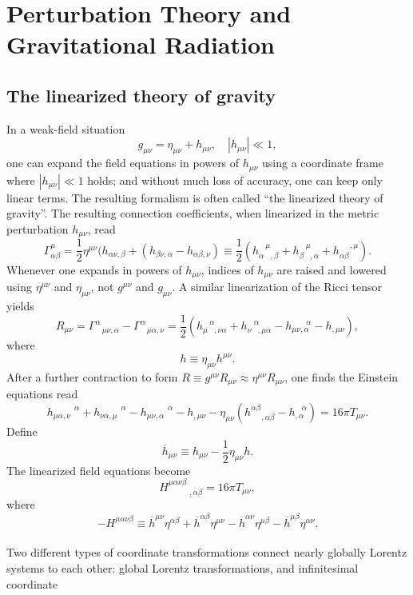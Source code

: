 \chapter{Perturbation Theory and Gravitational Radiation}
\section{The linearized theory of gravity}
In a weak-field situation
\[g_{\mu\nu} = \eta_{\mu\nu} + h_{\mu\nu} , \quad |h_{\mu\nu}| \ll 1 ,\]
one can expand the field equations in powers of $h_{\mu\nu}$ using a coordinate frame where $|h_{\mu\nu}| \ll 1$ holds; and without much loss of accuracy, one can keep only linear terms. The resulting formalism is often called ``the linearized theory of gravity''. The resulting connection coefficients, when linearized in the metric perturbation $h_{\mu\nu}$, read 
\[\Gamma^{\mu}_{\alpha \beta} = \frac{1}{2}\eta^{\mu\nu} (h_{\alpha\nu,\beta} + (h_{\beta\nu,\alpha} - h_{\alpha\beta,\nu}) \equiv \frac{1}{2}(h_{\alpha \phantom{*},\beta}^{\phantom{*} \mu} + h_{\beta \phantom{*},\alpha}^{\phantom{*} \mu} + h_{\alpha\beta}^{\phantom{**} ,\mu} ).\]
Whenever one expands in powers of $h_{\mu\nu}$, indices of $h_{\mu\nu}$ are raised and lowered using $\eta^{\mu\nu}$ and $\eta_{\mu\nu}$, not $g^{\mu\nu}$ and $g_{\mu\nu}$. A similar linearization of the Ricci tensor yields
\[R_{\mu\nu} = \Gamma^{\alpha}_{\phantom{*}\mu\nu,\alpha} - \Gamma^{\alpha}_{\phantom{*}\mu\alpha,\nu} = \frac{1}{2}(h_{\mu \phantom{*},\nu\alpha}^{\phantom{*} \alpha} + h_{\nu \phantom{*},\mu\alpha}^{\phantom{*} \alpha} - h_{\mu\nu,\alpha}^{\phantom{***}\alpha} - h_{,\mu\nu}),\]
where
\[h \equiv \eta_{\mu\nu}h^{\mu\nu}.\]
After a further contraction to form $R \equiv g^{\mu\nu}R_{\mu\nu} \approx \eta^{\mu\nu}R_{\mu\nu}$,
one finds the Einstein equations read
\[h_{\mu\alpha,\nu}^{\phantom{****}\alpha} + h_{\nu\alpha,\mu}^{\phantom{****}\alpha} - h_{\mu\nu,\alpha}^{\phantom{****}\alpha} - h_{,\mu\nu} - \eta_{\mu\nu}(h^{\alpha\beta}_{\phantom{**},\alpha\beta} - h_{,\alpha}^{\phantom{*}\alpha}) = 16\pi T_{\mu\nu}.\]
Define
\[\overline{h}_{\mu\nu} \equiv h_{\mu\nu} - \frac{1}{2}\eta_{\mu\nu}h.\]
The linearized field equations become
\[H^{\mu\alpha\nu\beta}_{\phantom{****},\alpha\beta} = 16\pi T_{\mu\nu},\]
where
\[-H^{\mu\alpha\nu\beta} \equiv \overline{h}^{\mu\nu}\eta^{\alpha\beta} + \overline{h}^{\alpha\beta}\eta^{\mu\nu} - \overline{h}^{\alpha\nu}\eta^{\mu\beta} - \overline{h}^{\mu\beta}\eta^{\alpha\nu} .\]
\\
Two different types of coordinate transformations connect nearly globally Lorentz systems to each other: global Lorentz transformations, and infinitesimal coordinate
